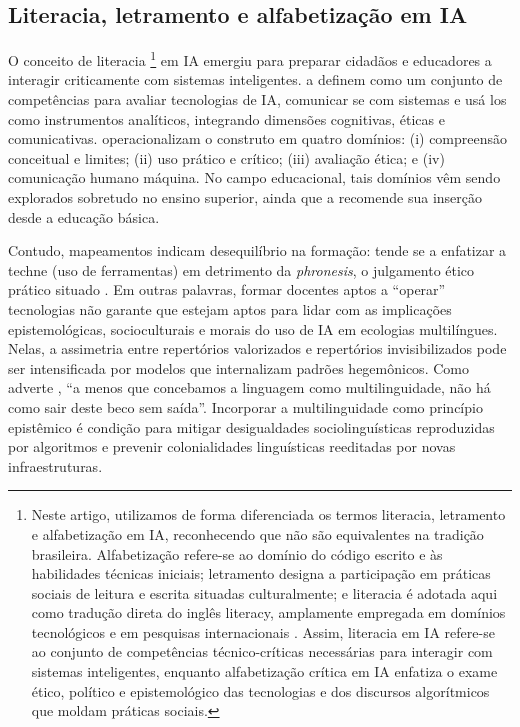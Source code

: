 \documentclass[portuguese]{textolivre}
\begin{document}
\subsection{Literacia, letramento e alfabetização em IA}\label{sec-alf}
O conceito de literacia \footnote{Neste artigo, utilizamos de forma diferenciada os termos literacia, letramento e alfabetização em IA, reconhecendo que não são equivalentes na tradição brasileira. Alfabetização refere-se ao domínio do código escrito e às habilidades técnicas iniciais; letramento designa a participação em práticas sociais de leitura e escrita situadas culturalmente; e literacia é adotada aqui como tradução direta do inglês literacy, amplamente empregada em domínios tecnológicos e em pesquisas internacionais \cite{LongMagerko2020, UNESCO2023}. Assim, literacia em IA refere-se ao conjunto de competências técnico-críticas necessárias para interagir com sistemas inteligentes, enquanto alfabetização crítica em IA \cite{RoeEtAl2025} enfatiza o exame ético, político e epistemológico das tecnologias e dos discursos algorítmicos que moldam práticas sociais.} em IA emergiu para preparar cidadãos e educadores a interagir criticamente com sistemas inteligentes. \textcite{LongMagerko2020} a definem como um conjunto de competências para avaliar tecnologias de IA, comunicar se com sistemas e usá los como instrumentos analíticos, integrando dimensões cognitivas, éticas e comunicativas. \textcite{NgEtAl2021} operacionalizam o construto em quatro domínios: (i) compreensão conceitual e limites; (ii) uso prático e crítico; (iii) avaliação ética; e (iv) comunicação humano máquina. No campo educacional, tais domínios vêm sendo explorados sobretudo no ensino superior, ainda que a \textcite{UNESCO2023} recomende sua inserção desde a educação básica.

Contudo, mapeamentos indicam desequilíbrio na formação: tende se a enfatizar a techne (uso de ferramentas) em detrimento da \textit{phronesis}, o julgamento ético prático situado \cite{SperlingEtAl2024}. Em outras palavras, formar docentes aptos a “operar” tecnologias não garante que estejam aptos para lidar com as implicações epistemológicas, socioculturais e morais do uso de IA em ecologias multilíngues. Nelas, a assimetria entre repertórios valorizados e repertórios invisibilizados pode ser intensificada por modelos que internalizam padrões hegemônicos. Como adverte \textcite[p.~6, tradução nossa]{Agnihotri2025}, “a menos que concebamos a linguagem como multilinguidade, não há como sair deste beco sem saída”. Incorporar a multilinguidade como princípio epistêmico é condição para mitigar desigualdades sociolinguísticas reproduzidas por algoritmos e prevenir colonialidades linguísticas reeditadas por novas infraestruturas.
\end{document}
